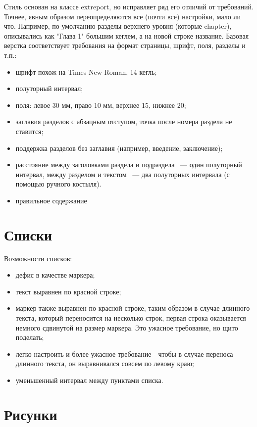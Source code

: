 Стиль основан на классе extreport, но исправляет ряд его отличий от требований. Точнее, явным образом
переопределяются все (почти все) настройки, мало ли что. Например, по-умолчанию разделы верхнего уровня
(которые chapter), описывались как "Глава 1" большим кеглем, а на новой строке название. Базовая верстка
соответствует требования на формат страницы, шрифт, поля, разделы и т.п.:
\begin{itemize}
	\item шрифт похож на Times New Roman, 14 кегль;
	\item полуторный интервал;
	\item поля: левое 30 мм, право 10 мм, верхнее 15, нижнее 20;
	\item заглавия разделов с абзацным отступом, точка после номера раздела не ставится;
	\item поддержка разделов без заглавия (например, введение, заключение);
	\item расстояние между заголовками раздела и подраздела ~--- один полуторный интервал, между 
	      разделом и текстом ~--- два полуторных интервала (с помощью ручного костыля).
	\item правильное содержание
\end{itemize}

\section{Списки}
\aftertitle

Возможности списков:
\begin{itemize}
	\item дефис в качестве маркера;
	\item текст выравнен по красной строке;
	\item маркер также выравнен по красной строке, таким образом в случае длинного текста, который переносится
	      на несколько строк, первая строка оказывается немного сдвинутой на размер маркера. Это ужасное требование,
	      но щито поделать;
	\item легко настроить и более ужасное требование - чтобы в случае переноса длинного текста, он выравнивался
	      совсем по левому краю;
	\item уменьшенный интервал между пунктами списка.
\end{itemize}

\section{Рисунки}
\aftertitle

